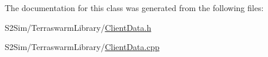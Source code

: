 The documentation for this class was generated from the following files\-:\begin{DoxyCompactItemize}
\item 
S2\-Sim/\-Terraswarm\-Library/\hyperlink{_client_data_8h}{Client\-Data.\-h}\item 
S2\-Sim/\-Terraswarm\-Library/\hyperlink{_client_data_8cpp}{Client\-Data.\-cpp}\end{DoxyCompactItemize}
